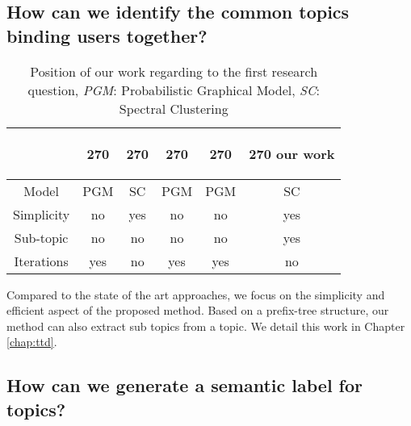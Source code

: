 \subsection{How can we identify the common topics binding users together?}
    
    \begin{table}[htp]
        \centering
        \begin{tabular}{c c c c c c}
        &
        \begin{turn}{270}
            \cite{blei2003latent} \end{turn} 
        &
        \begin{turn}{270} 
            \cite{Chang:2013} 
        \end{turn}
        &
        \begin{turn}{270} 
            \cite{yang2013cqarank}
        \end{turn}
        &
        \begin{turn}{270}
            \cite{hu2014user}
        \end{turn}
        &
        \begin{turn}{270}
        our work
        \end{turn}
        \\ \hline
        Model & PGM & SC & PGM & PGM & SC\\ \hline
        Simplicity & no & yes & no & no & yes\\ \hline
        Sub-topic & no & no & no & no &  yes \\ \hline
        Iterations & yes & no & yes& yes & no \\ \hline
        
        \end{tabular}
        \caption{Position of our work regarding to the first research question, \textit{PGM}: Probabilistic Graphical Model, \textit{SC}: Spectral Clustering}
        \label{tab:rq2compare}
    \end{table}
Compared to the state of the art approaches, we focus on the simplicity and efficient aspect of the proposed method. Based on a prefix-tree structure, our method can also extract sub topics from a topic. We detail this work in Chapter \ref{chap:ttd}.
    
    
    
\subsection{How can we generate a semantic label for topics?}



